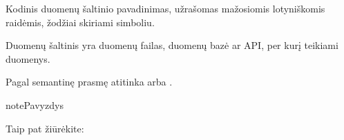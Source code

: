 \documentclass[letterpaper,10pt,lithuanian]{sphinxmanual}
\begin{document}
\begin{fulllineitems}
\label{\detokenize{formatas:resource}}
\pysigstartsignatures
{}
\pysigstopsignatures
\sphinxAtStartPar
{}

\sphinxAtStartPar
Kodinis duomenų šaltinio pavadinimas, užrašomas mažosiomis lotyniškomis
raidėmis, žodžiai skiriami \sphinxcode{\sphinxupquote{\_}} simboliu.

\sphinxAtStartPar
Duomenų šaltinis yra duomenų failas, duomenų bazė ar API, per kurį teikiami
duomenys.

\sphinxAtStartPar
Pagal semantinę prasmę atitinka  arba .

\begin{sphinxadmonition}{note}{Pavyzdys}

\begin{DUlineblock}{0em}
\item[] 
\item[] 
\end{DUlineblock}
\end{sphinxadmonition}


\begin{sphinxseealso}{Taip pat žiūrėkite:}

\begin{DUlineblock}{0em}
\item[] {\hyperref[\detokenize{dimensijos:resource}]{}}
\item[] {\hyperref[\detokenize{saltiniai:duomenu-saltiniai}]{}}
\end{DUlineblock}


\end{sphinxseealso}


\end{fulllineitems}

\end{document}
